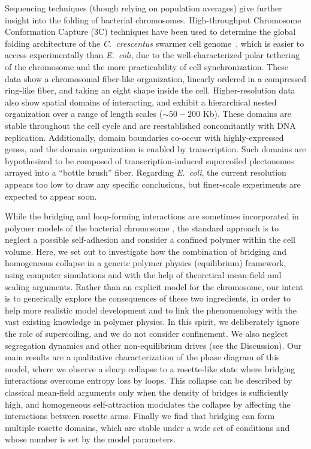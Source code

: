 \documentclass[
preprint,
a4paper,
12pt,
superscriptaddress,
pre]{revtex4}
\begin{document}
Sequencing techniques (though relying on population averages) give
further insight into the folding of bacterial chromosomes.
High-throughput Chromosome Conformation Capture (3C) techniques have
been used to determine the global folding architecture of the
\emph{C.~crescentus} swarmer cell genome~\cite{Le2013,Umbarger2011},
which is easier to access experimentally than \emph{E.~coli}, due to
the well-characterized polar tethering of the chromosome and 
%
the more practicability of cell synchronization.
%
These data show a chromosomal fiber-like organization, linearly
ordered in a compressed ring-like fiber, and taking an eight shape
inside the cell.
%
Higher-resolution data~\cite{Le2013} also show spatial domains of
interacting, and exhibit a hierarchical nested organization over a
range of length scales ($\sim50-200$ Kb). These domains are stable
throughout the cell cycle and are reestablished concomitantly with DNA
replication.  Additionally, domain boundaries co-occur with
highly-expressed genes, and the domain organization is enabled by
transcription. Such domains are hypothesized to be composed of
transcription-induced supercoiled plectonemes arrayed into a ``bottle
brush'' fiber.
Regarding \emph{E.~coli}, the current resolution appears too low
\cite{Cagliero2013} to draw any specific conclusions, but finer-scale
experiments are expected to appear soon.



While the bridging and loop-forming interactions are sometimes
incorporated in polymer models of the bacterial chromosome
\cite{Junier2013,Fritsche2012,Heermann2012}, the standard approach is
to neglect a possible self-adhesion and consider a confined polymer
within the cell volume.
Here, we set out to investigate how the combination of bridging and
homogeneous collapse in a generic polymer physics (equilibrium)
framework, using computer simulations and with the help of theoretical
mean-field and scaling arguments.
Rather than an explicit model for the chromosome, our intent is to
generically explore the consequences of these two ingredients, in order
to help more realistic model development and to link the phenomenology
with the vast existing knowledge in polymer physics.
In this spirit, we deliberately ignore the role of supercoiling, and
we do not consider confinement. We also neglect segregation dynamics
and other non-equilibrium drives (see the Discussion).
Our main results are a qualitative characterization of the phase
diagram of this model, where we observe a sharp collapse to a
rosette-like state where bridging interactions overcome entropy loss
by loops. This collapse can be described by classical mean-field
arguments only when the density of bridges is sufficiently high, and
homogeneous self-attraction modulates the collapse by affecting the
interactions between rosette arms. Finally we find that bridging can
form multiple rosette domains, which are stable under a wide set of
conditions and whose number is set by the model parameters.
\end{document}

